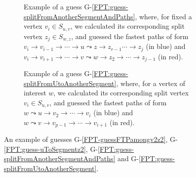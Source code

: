 \documentclass[a4paper,UKenglish,cleveref, autoref, thm-restate]{lipics-v2021}
\begin{document}
\begin{figure}[t]
	\begin{subfigure}[b]{0.48\textwidth}
			\centering
			\caption{Example of a guess G-\ref{FPT:guess-splitFromAnotherSegmentAndPaths}, where, for fixed a vertex $v_i \in S_{u,v}$,
				we calculated its corresponding split vertex $z_j \in S_{w,z}$,
				and guessed the fastest paths of form
				$v_i \rightarrow v_{i-1} \rightarrow \cdots \rightarrow u \leadsto z \rightarrow z_{r-1} \cdots \rightarrow z_j$ (in blue) 
				and $v_i \rightarrow v_{i+1} \rightarrow \cdots \rightarrow v \leadsto w \rightarrow z_2 \rightarrow \cdots \rightarrow z_{j-1}$ (in red). 
				\label{fig:FPT-guessG6}}
		\end{subfigure}
	\quad
	\begin{subfigure}[b]{0.48\textwidth}
		\centering
	\caption{Example of a guess G-\ref{FPT:guess-splitFromUtoAnotherSegment}, where, for a vertex of interest $w$, 
		we
		calculated its corresponding split vertex $v_i \in S_{u,v}$,
		and guessed the fastest paths of form
		$w \leadsto u \rightarrow v_2 \rightarrow \cdots \rightarrow v_i$  (in blue) 
		and $w \leadsto v \rightarrow v_{p-1} \rightarrow \cdots \rightarrow v_{i+1}$ (in red). 
		\label{fig:FPT-guessG7}}
	\end{subfigure}
\caption{An example of guesses G-\ref{FPT-guessFTPamongv2z2}, G-\ref{FPT:guess-uToSegmentz2}, G-\ref{FPT:guess-splitFromAnotherSegmentAndPaths} and G-\ref{FPT:guess-splitFromUtoAnotherSegment}.}
\end{figure}
\end{document}
